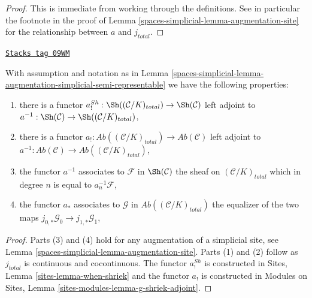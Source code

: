 \begin{proof}
This is immediate from working through the definitions.
See in particular the footnote in the proof of
Lemma \ref{spaces-simplicial-lemma-augmentation-site}
for the relationship between $a$ and $j_{total}$.
\end{proof}

\begin{lemma}[Comparison]
\label{spaces-simplicial-lemma-comparison}
\href{https://stacks.math.columbia.edu/tag/09WM}{\texttt{Stacks tag 09WM}}

With assumption and notation as in
Lemma \ref{spaces-simplicial-lemma-augmentation-simplicial-semi-representable}
we have the following properties:
\begin{enumerate}
\item there is a functor
$a^{Sh}_! : \Sh((\mathcal{C}/K)_{total}) \to \Sh(\mathcal{C})$
left adjoint to $a^{-1} : \Sh(\mathcal{C}) \to \Sh((\mathcal{C}/K)_{total})$,
\item there is a functor
$a_! : \textit{Ab}((\mathcal{C}/K)_{total}) \to \textit{Ab}(\mathcal{C})$
left adjoint to
$a^{-1} : \textit{Ab}(\mathcal{C}) \to \textit{Ab}((\mathcal{C}/K)_{total})$,
\item the functor $a^{-1}$ associates to
$\mathcal{F}$ in $\Sh(\mathcal{C})$ the sheaf on $(\mathcal{C}/K)_{total}$
which in degree $n$ is equal to $a_n^{-1}\mathcal{F}$,
\item the functor $a_*$ associates to $\mathcal{G}$ in
$\textit{Ab}((\mathcal{C}/K)_{total})$ the equalizer of the two maps
$j_{0, *}\mathcal{G}_0 \to j_{1, *}\mathcal{G}_1$,
\end{enumerate}
\end{lemma}

\begin{proof}
Parts (3) and (4) hold for any augmentation of a
simplicial site, see Lemma \ref{spaces-simplicial-lemma-augmentation-site}.
Parts (1) and (2) follow as $j_{total}$ is continuous and cocontinuous.
The functor $a^{Sh}_!$ is constructed in
Sites, Lemma \ref{sites-lemma-when-shriek}
and the functor $a_!$ is constructed in
Modules on Sites, Lemma
\ref{sites-modules-lemma-g-shriek-adjoint}.
\end{proof}

